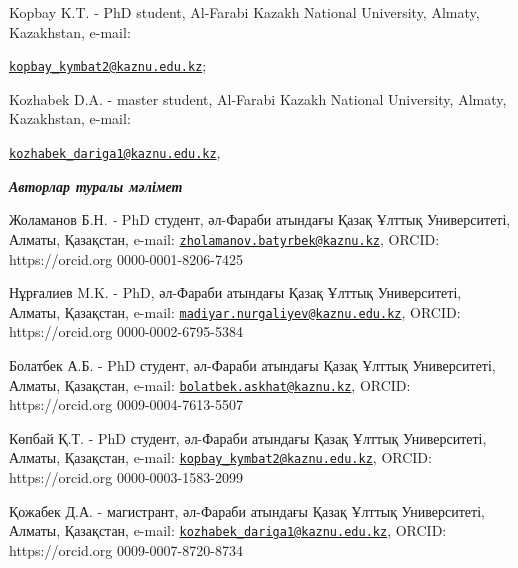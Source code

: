 Kopbay K.T. - PhD student, Al-Farabi Kazakh National University, Almaty,
Kazakhstan, e-mail:

\href{mailto:kopbay_kymbat2@kaznu.edu.kz}{\nolinkurl{kopbay\_kymbat2@kaznu.edu.kz}};

Kozhabek D.A. - master student, Al-Farabi Kazakh National University,
Almaty, Kazakhstan, e-mail:

\href{mailto:kozhabek_dariga1@kaznu.edu.kz}{\nolinkurl{kozhabek\_dariga1@kaznu.edu.kz}},

\emph{{\bfseries Авторлар туралы мәлімет}}

Жоламанов Б.Н. \emph{-} PhD студент, әл-Фараби атындағы Қазақ Ұлттық
Университеті, Алматы, Қазақстан, e-mail:
\href{mailto:zholamanov.batyrbek@kaznu.kz}{\nolinkurl{zholamanov.batyrbek@kaznu.kz}},
ORCID: https://orcid.org 0000-0001-8206-7425

Нұрғалиев M.K. - PhD, әл-Фараби атындағы Қазақ Ұлттық Университеті,
Алматы, Қазақстан, e-mail:
\href{mailto:madiyar.nurgaliyev@kaznu.edu.kz}{\nolinkurl{madiyar.nurgaliyev@kaznu.edu.kz}},
ORCID: https://orcid.org 0000-0002-6795-5384

Болатбек А.Б. - PhD студент, әл-Фараби атындағы Қазақ Ұлттық
Университеті, Алматы, Қазақстан, e-mail:
\href{mailto:bolatbek.askhat@kaznu.kz}{\nolinkurl{bolatbek.askhat@kaznu.kz}},
ORCID: https://orcid.org 0009-0004-7613-5507

Көпбай Қ.Т. - PhD студент, әл-Фараби атындағы Қазақ Ұлттық Университеті,
Алматы, Қазақстан, e-mail:
\href{mailto:kopbay_kymbat2@kaznu.edu.kz}{\nolinkurl{kopbay\_kymbat2@kaznu.edu.kz}},
ORCID: https://orcid.org 0000-0003-1583-2099

Қожабек Д.А. - магистрант, әл-Фараби атындағы Қазақ Ұлттық Университеті,
Алматы, Қазақстан, e-mail:
\href{mailto:kozhabek_dariga1@kaznu.edu.kz}{\nolinkurl{kozhabek\_dariga1@kaznu.edu.kz}},
ORCID: https://orcid.org 0009-0007-8720-8734\